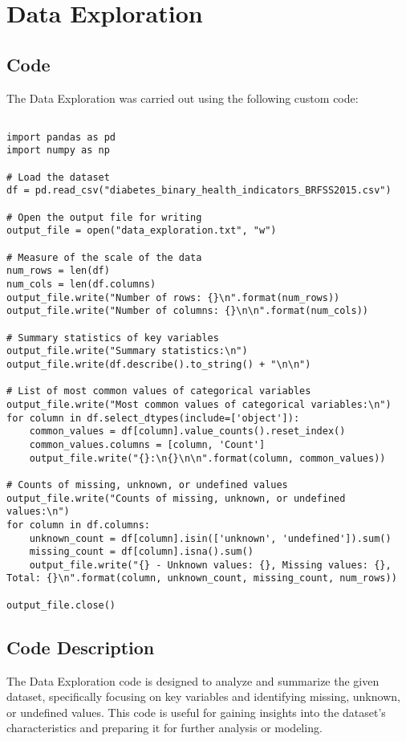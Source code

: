 \documentclass[11pt]{article}
\begin{document}
\section*{Data Exploration} \subsection*{Code}The Data Exploration was carried out using the following custom code:

\begin{verbatim}

import pandas as pd
import numpy as np

# Load the dataset
df = pd.read_csv("diabetes_binary_health_indicators_BRFSS2015.csv")

# Open the output file for writing
output_file = open("data_exploration.txt", "w")

# Measure of the scale of the data
num_rows = len(df)
num_cols = len(df.columns)
output_file.write("Number of rows: {}\n".format(num_rows))
output_file.write("Number of columns: {}\n\n".format(num_cols))

# Summary statistics of key variables
output_file.write("Summary statistics:\n")
output_file.write(df.describe().to_string() + "\n\n")

# List of most common values of categorical variables
output_file.write("Most common values of categorical variables:\n")
for column in df.select_dtypes(include=['object']):
    common_values = df[column].value_counts().reset_index()
    common_values.columns = [column, 'Count']
    output_file.write("{}:\n{}\n\n".format(column, common_values))

# Counts of missing, unknown, or undefined values
output_file.write("Counts of missing, unknown, or undefined values:\n")
for column in df.columns:
    unknown_count = df[column].isin(['unknown', 'undefined']).sum()
    missing_count = df[column].isna().sum()
    output_file.write("{} - Unknown values: {}, Missing values: {}, Total: {}\n".format(column, unknown_count, missing_count, num_rows))

output_file.close()

\end{verbatim}

\subsection*{Code Description}

The Data Exploration code is designed to analyze and summarize the given dataset, specifically focusing on key variables and identifying missing, unknown, or undefined values. This code is useful for gaining insights into the dataset's characteristics and preparing it for further analysis or modeling.
\end{document}
